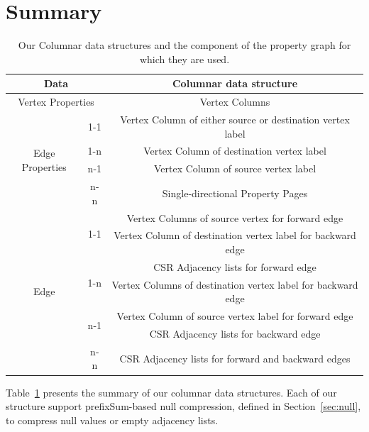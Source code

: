 

\section{Summary}

\begin{table}[t!]
	\centering
	\bgroup
	\setlength{\tabcolsep}{10pt}
	\def\arraystretch{1.3}%
	\begin{tabular}{ |c|c|c| } 
		\hline
		\multicolumn{2}{|c|}{\textbf{Data}} & \textbf{Columnar data structure} \\
		\hline \hline
		\multicolumn{2}{|c|}{Vertex Properties} & Vertex Columns \\
		\hline \hline
		\multirow{4}{60pt}{Edge Properties} & 1-1 & Vertex Column of either source or destination vertex label\\
		\cline{2-3}
		& 1-n & Vertex Column of destination vertex label\\
		\cline{2-3}
		& n-1 & Vertex Column of source vertex label\\
		\cline{2-3}
		& n-n & Single-directional Property Pages \\
		\hline \hline
		\multirow{7}{60pt}{Edge} & \multirow{2}{20pt}{1-1} & Vertex Columns of source vertex for forward edge \\
		&& Vertex Column of destination vertex label for backward edge \\
		\cline{2-3}
		& \multirow{2}{20pt}{1-n} & CSR Adjacency lists for forward edge \\
		&& Vertex Columns of destination vertex label for backward edge \\
		\cline{2-3}
		& \multirow{2}{20pt}{n-1} & Vertex Column of source vertex label for forward edge \\
		&& CSR Adjacency lists for backward edge \\
		\cline{2-3}
		& \multirow{1}{20pt}{n-n} & CSR Adjacency lists for forward and backward edges \\
		\hline
	\end{tabular}
	\egroup
	\captionsetup{justification=centering}
	\caption{Our Columnar data structures and the component of the property graph for which they are used.}
	\label{tbl:summ}
\end{table}

Table~\ref{tbl:summ} presents the summary of our columnar data structures. Each of our structure support prefixSum-based null compression, defined in Section~\ref{sec:null}, to compress null values or empty adjacency lists.
